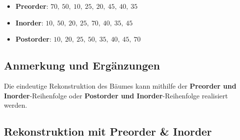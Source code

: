 \begin{itemize}
    \item \textbf{Preorder}: $70,\ 50,\ 10,\ 25,\ 20,\ 45,\ 40,\ 35$
    \item \textbf{Inorder}: $10,\ 50,\ 20,\ 25,\ 70,\ 40,\ 35,\ 45$
    \item \textbf{Postorder}: $10,\ 20,\ 25,\ 50,\ 35,\ 40,\ 45,\ 70$
\end{itemize}


\subsection{Anmerkung und Ergänzungen}

Die eindeutige Rekonstruktion des Bäumes kann mithilfe der  \textbf{Preorder und Inorder}-Reihenfolge oder \textbf{Postorder und Inorder}-Reihenfolge realisiert werden.

\subsection*{Rekonstruktion mit Preorder \& Inorder}

